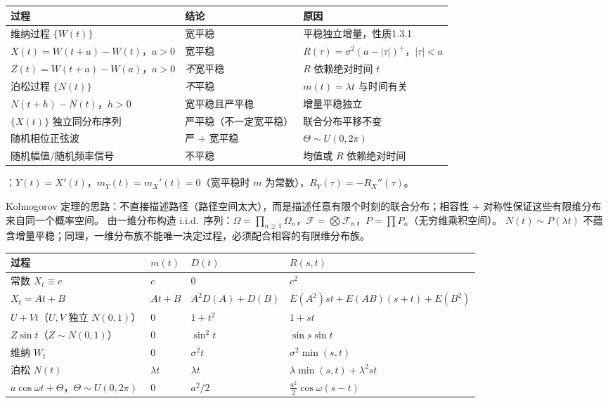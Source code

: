 \documentclass[UTF8,12pt,a4paper]{ctexart}
\begin{document}
\begin{center}\footnotesize
\begin{tabular}{p{2.55cm}p{3.28cm}p{2.80cm}}\hline
过程 & 结论 & 原因\\\hline
维纳过程 $\{W(t)\}$ & 宽平稳 & 平稳独立增量，性质1.3.1\\
$X(t)=W(t+a)-W(t)$，$a>0$ & 宽平稳 & $R(\tau)=\sigma^2(a-|\tau|)^+$，$|\tau|<a$\\
$Z(t)=W(t+a)-W(a)$，$a>0$ & \emph{不}宽平稳 & $R$ 依赖绝对时间 $t$\\
泊松过程 $\{N(t)\}$ & \emph{不}平稳 & $m(t)=\lambda t$ 与时间有关\\
$N(t+h)-N(t)$，$h>0$ & 宽平稳且严平稳 & 增量平稳独立\\
$\{X(t)\}$ 独立同分布序列 & 严平稳（不一定宽平稳） & 联合分布平移不变\\
随机相位正弦波 & 严 + 宽平稳 & $\Theta\sim U(0,2\pi)$\\
随机幅值/随机频率信号 & 不平稳 & 均值或 $R$ 依赖绝对时间\\\hline
\end{tabular}\end{center}
：$Y(t)=X'(t)$，$m_Y(t)=m_X'(t)=0$（宽平稳时 $m$ 为常数），$R_Y(\tau)=-R_X''(\tau)$。

Kolmogorov 定理的思路：不直接描述路径（路径空间太大），而是描述任意有限个时刻的联合分布；相容性 + 对称性保证这些有限维分布来自同一个概率空间。
由一维分布构造 i.i.d.\ 序列：$\Omega=\prod_{n\ge1}\Omega_n$，$\mathcal F=\bigotimes\mathcal F_n$，$P=\prod P_n$（无穷维乘积空间）。
 $N(t)\sim P(\lambda t)$ 不蕴含增量平稳；同理，一维分布族不能唯一决定过程，必须配合相容的有限维分布族。

\begin{center}\footnotesize
\begin{tabular}{p{2.16cm}p{1.55cm}p{1.67cm}p{3.10cm}}\hline
过程 & $m(t)$ & $D(t)$ & $R(s,t)$\\\hline
常数 $X_t\equiv c$ & $c$ & $0$ & $c^2$\\
$X_t=At+B$ & $A t+B$ & $A^2D(A)+D(B)$ & $E(A^2)st+E(AB)(s+t)+E(B^2)$\\
$U+Vt$（$U,V$ 独立 $N(0,1)$）& $0$ & $1+t^2$ & $1+st$\\
$Z\sin t$（$Z\sim N(0,1)$）& $0$ & $\sin^2t$ & $\sin s\sin t$\\
维纳 $W_t$ & $0$ & $\sigma^2t$ & $\sigma^2\min(s,t)$\\
泊松 $N(t)$ & $\lambda t$ & $\lambda t$ & $\lambda\min(s,t)+\lambda^2st$\\
$a\cos\omega t+\Theta$，$\Theta\sim U(0,2\pi)$ & $0$ & $a^2/2$ & $\frac{a^2}{2}\cos\omega(s-t)$\\\hline
\end{tabular}\end{center}
\end{document}
